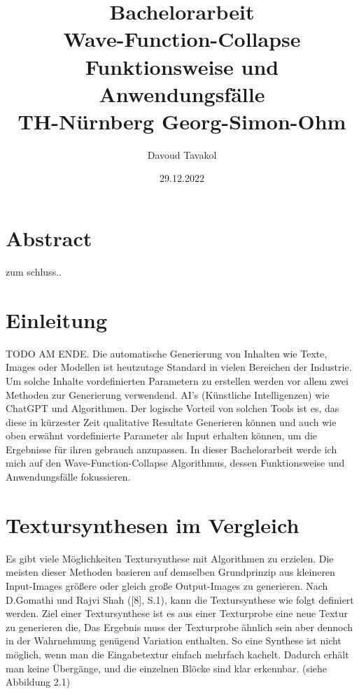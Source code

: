 \documentclass[12pt]{report}
\title{
{Bachelorarbeit}\\
{\vspace{10mm}}
{\small Wave-Function-Collapse}\\
{\small Funktionsweise und Anwendungsfälle}\\
{\small TH-Nürnberg Georg-Simon-Ohm}\\
}
\author{Davoud Tavakol}
\date{29.12.2022}
\begin{document}
\maketitle

{\let\clearpage\relax\chapter*{Abstract}}

zum schluss..

\tableofcontents




\chapter{Einleitung}

TODO AM ENDE.
Die automatische Generierung von Inhalten wie Texte, Images oder Modellen ist heutzutage Standard in vielen Bereichen der Industrie.
Um solche Inhalte vordefinierten Parametern zu erstellen werden vor allem zwei Methoden zur Generierung verwendend.
AI's {(Künstliche Intelligenzen)} wie ChatGPT und Algorithmen.
Der logische Vorteil von solchen Tools ist es, das diese in kürzester Zeit qualitative Resultate Generieren können und auch wie oben erwähnt vordefinierte Parameter als Input erhalten können,
um die Ergebnisse für ihren gebrauch anzupassen.
In dieser Bachelorarbeit werde ich mich auf den Wave-Function-Collapse Algorithmus, dessen Funktionsweise und Anwendungsfälle fokussieren.

\chapter{Textursynthesen im Vergleich}

Es gibt viele Möglichkeiten Textursynthese mit Algorithmen zu erzielen.
Die meisten dieser Methoden basieren auf demselben Grundprinzip aus kleineren Input-Images größere oder gleich große Output-Images zu generieren.
Nach D.Gomathi und Rajvi Shah {([8], S.1)}, kann die Textursynthese wie folgt definiert werden.
\newline
Ziel einer Textursynthese ist es aus einer Texturprobe eine neue Textur zu generieren die, 
Das Ergebnis muss der Texturprobe ähnlich sein aber dennoch in der Wahrnehmung genügend Variation enthalten.
So eine Synthese ist nicht möglich, wenn man die Eingabetextur einfach mehrfach kachelt.
Dadurch erhält man keine  Übergänge, und die einzelnen Blöcke sind klar erkennbar. {(siehe Abbildung 2.1)}
\end{document}
